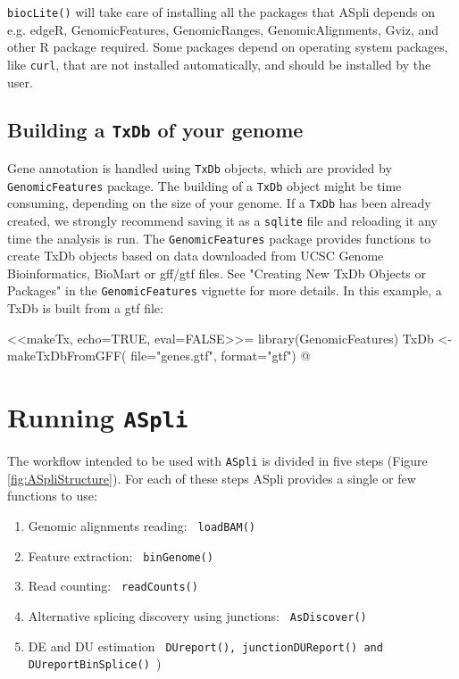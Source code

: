 \documentclass{article}
\begin{document}
\texttt{biocLite()} will take care of installing all the packages that ASpli 
depends on e.g. edgeR, GenomicFeatures, GenomicRanges, GenomicAlignments, Gviz, 
and other R package required. Some packages depend on operating system
packages, like \texttt{curl}, that are not installed automatically, and should
be installed by the user.

\subsection{ Building a \texttt{TxDb} of your genome }
Gene annotation is handled using \texttt{TxDb} objects, which are provided by
\texttt{GenomicFeatures} package. The building of a \texttt{TxDb} object might 
be time consuming, depending on the size of your genome. If a \texttt{TxDb} has
been already created, we strongly recommend saving it as a \texttt{sqlite} file
and reloading it any time the analysis is run. The \texttt{GenomicFeatures} 
package provides functions to create TxDb objects based on data downloaded from
UCSC Genome Bioinformatics, BioMart or gff/gtf files. See "Creating New TxDb 
Objects or Packages" in the \texttt{GenomicFeatures} vignette for more details.
In this example, a TxDb is built from a gtf file:

<<makeTx, echo=TRUE, eval=FALSE>>=
library(GenomicFeatures)
TxDb <- makeTxDbFromGFF(
  file="genes.gtf",
  format="gtf")
@



\section{Running \texttt{ASpli}}

The workflow intended to be used with \texttt{ASpli} is divided in five
steps (Figure \ref{fig:ASpliStructure}). For each of these steps
ASpli provides a single or few functions to use:
\begin{enumerate}
  \item Genomic alignments reading: \texttt{ loadBAM() }
  \item Feature extraction: \texttt{ binGenome() }
  \item Read counting: \texttt{ readCounts() }
  \item Alternative splicing discovery using junctions: \texttt{ AsDiscover() }
  \item DE and DU estimation \texttt{ DUreport(), junctionDUReport() and
  DUreportBinSplice() })
\end{enumerate}
\end{document}
